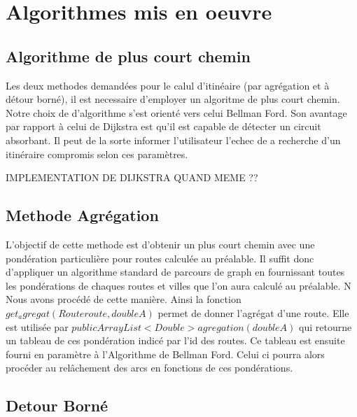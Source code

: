 \chapter{Algorithmes mis en oeuvre}


\section{Algorithme de plus court chemin}
Les deux methodes demandées pour le calul d'itinéaire (par agrégation et à détour borné), il est necessaire  d'employer un algoritme de plus court chemin.
Notre choix de d'algorithme s'est orienté vers celui Bellman Ford. Son avantage par rapport à celui de Dijkstra est qu'il est capable de détecter un circuit absorbant. Il peut de la sorte informer l'utilisateur l'echec de a recherche d'un itinéraire compromis selon ces paramètres. 

IMPLEMENTATION DE DIJKSTRA QUAND MEME ??


\section{Methode Agrégation}
L'objectif de cette methode est d'obtenir un plus court chemin avec une pondération particulière pour routes calculée au préalable.
Il suffit donc d'appliquer un algorithme standard de parcours de graph en fournissant toutes les pondérations de chaques routes et villes que l'on aura calculé au préalable. N Nous avons procédé de cette manière. Ainsi la fonction $get_agregat(Route route, double A)$ permet de donner l'agrégat d'une route. Elle est utilisée par  $public ArrayList<Double> agregation(double A)$ qui retourne un tableau de ces pondération indicé par l'id des routes. Ce tableau est ensuite fourni en paramètre à l'Algorithme de Bellman Ford. Celui ci pourra alors procéder au relâchement des arcs en fonctions de ces pondérations. 

\section{Detour Borné}
 
